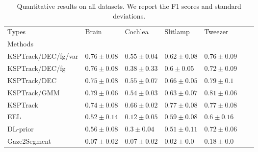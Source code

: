 \begin{table}
\centering
\caption{
Quantitative results on all datasets. We report the F1 scores and standard deviations.
}
\label{tab:results}
\begin{tabular}{llp{1.8cm}p{1.8cm}p{1.8cm}p{1.8cm}p{1.8cm}}
\toprule
Types &                 Brain &               Cochlea &              Slitlamp &               Tweezer \\
Methods             &                       &                       &                       &                       \\
\midrule
KSPTrack/DEC/fg/var &       $0.76 \pm 0.08$ &       $0.55 \pm 0.04$ &       $0.62 \pm 0.08$ &       $0.76 \pm 0.09$ \\
KSPTrack/DEC/fg     &       $0.76 \pm 0.08$ &       $0.38 \pm 0.33$ &        $0.6 \pm 0.05$ &       $0.72 \pm 0.09$ \\
KSPTrack/DEC        &       $0.75 \pm 0.08$ &       $0.55 \pm 0.07$ &       $0.66 \pm 0.05$ &        $0.79 \pm 0.1$ \\
KSPTrack/GMM        &  $\bm{0.79} \pm 0.06$ &       $0.54 \pm 0.03$ &       $0.63 \pm 0.07$ &  $\bm{0.81} \pm 0.06$ \\
\hdashline
KSPTrack            &       $0.74 \pm 0.08$ &  $\bm{0.66} \pm 0.02$ &  $\bm{0.77} \pm 0.08$ &       $0.77 \pm 0.08$ \\
EEL                 &       $0.52 \pm 0.14$ &       $0.12 \pm 0.05$ &       $0.59 \pm 0.08$ &        $0.6 \pm 0.16$ \\
DL-prior            &       $0.56 \pm 0.08$ &        $0.3 \pm 0.04$ &       $0.51 \pm 0.11$ &       $0.72 \pm 0.06$ \\
Gaze2Segment        &       $0.07 \pm 0.02$ &       $0.07 \pm 0.02$ &        $0.02 \pm 0.0$ &        $0.18 \pm 0.0$ \\
\bottomrule
\end{tabular}
\end{table}
